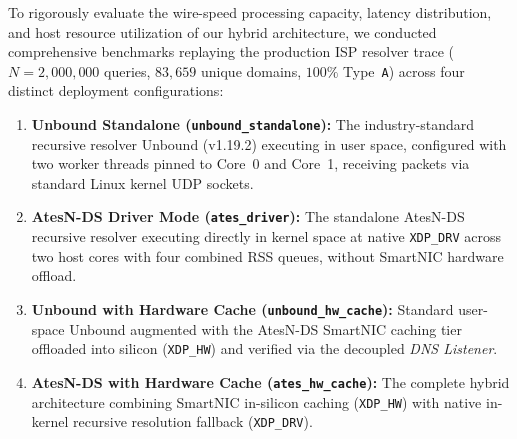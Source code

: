 \documentclass[a4paper,fleqn,colorlinks,hidelinks]{cas-sc}
\begin{document}
To rigorously evaluate the wire-speed processing capacity, latency distribution, and host resource utilization of our hybrid architecture, we conducted comprehensive benchmarks replaying the production ISP resolver trace ($N = 2{,}000{,}000$ queries, $83{,}659$ unique domains, $100\%$ Type~\texttt{A}) across four distinct deployment configurations:
\begin{enumerate}
    \item \textbf{Unbound Standalone (\texttt{unbound\_standalone}):} The industry-standard recursive resolver Unbound (v1.19.2) executing in user space, configured with two worker threads pinned to Core~0 and Core~1, receiving packets via standard Linux kernel UDP sockets.
    \item \textbf{AtesN-DS Driver Mode (\texttt{ates\_driver}):} The standalone AtesN-DS recursive resolver executing directly in kernel space at native \texttt{XDP\_DRV} across two host cores with four combined RSS queues, without SmartNIC hardware offload.
    \item \textbf{Unbound with Hardware Cache (\texttt{unbound\_hw\_cache}):} Standard user-space Unbound augmented with the AtesN-DS SmartNIC caching tier offloaded into silicon (\texttt{XDP\_HW}) and verified via the decoupled \textit{DNS Listener}.
    \item \textbf{AtesN-DS with Hardware Cache (\texttt{ates\_hw\_cache}):} The complete hybrid architecture combining SmartNIC in-silicon caching (\texttt{XDP\_HW}) with native in-kernel recursive resolution fallback (\texttt{XDP\_DRV}).
\end{enumerate}
\end{document}
